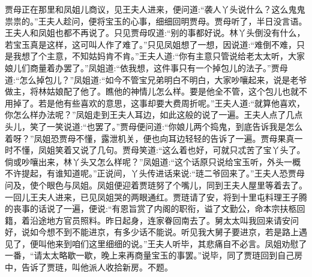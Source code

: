 \begin{parag}
    贾母正在那里和凤姐儿商议，见王夫人进来，便问道:“袭人丫头说什么？这么鬼鬼祟祟的。”王夫人趁问，便将宝玉的心事，细细回明贾母。贾母听了，半日没言语。王夫人和凤姐也都不再说了。只见贾母叹道:“别的事都好说。林丫头倒没有什么，若宝玉真是这样，这可叫人作了难了。”只见凤姐想了一想，因说道:“难倒不难，只是我想了个主意，不知姑妈肯不肯。”王夫人道:“你有主意只管说给老太太听，大家娘儿们商量着办罢了。”凤姐道:“依我想，这件事只有一个掉包儿的法子。”贾母道:“怎么掉包儿？”凤姐道:“如今不管宝兄弟明白不明白，大家吵嚷起来，说是老爷做主，将林姑娘配了他了。瞧他的神情儿怎么样。要是他全不管，这个包儿也就不用掉了。若是他有些喜欢的意思，这事却要大费周折呢。”王夫人道:“就算他喜欢，你怎么样办法呢？”凤姐走到王夫人耳边，如此这般的说了一遍。王夫人点了几点头儿，笑了一笑说道:“也罢了。”贾母便问道:“你娘儿两个捣鬼，到底告诉我是怎么着呀？”凤姐恐贾母不懂，露泄机关，便也向耳边轻轻的告诉了一遍。贾母果真一时不懂，凤姐笑着又说了几句。贾母笑道:“这么着也好，可就只忒苦了宝丫头了。倘或吵嚷出来，林丫头又怎么样呢？”凤姐道:“这个话原只说给宝玉听，外头一概不许提起，有谁知道呢。”正说间，丫头传进话来说:“琏二爷回来了。”王夫人恐贾母问及，使个眼色与凤姐。凤姐便迎着贾琏努了个嘴儿，同到王夫人屋里等着去了。一回儿王夫人进来，已见凤姐哭的两眼通红。贾琏请了安，将到十里屯料理王子腾的丧事的话说了一遍，便说:“有恩旨赏了内阁的职衔，谥了文勤公，命本宗扶柩回籍，着沿途地方官员照料。昨日起身，连家眷回南去了。舅太太叫我回来请安问好，说如今想不到不能进京，有多少话不能说。听见我大舅子要进京，若是路上遇见了，便叫他来到咱们这里细细的说。”王夫人听毕，其悲痛自不必言。凤姐劝慰了一番，“请太太略歇一歇，晚上来再商量宝玉的事罢。”说毕，同了贾琏回到自己房中，告诉了贾琏，叫他派人收拾新房。不题。
\end{parag}


